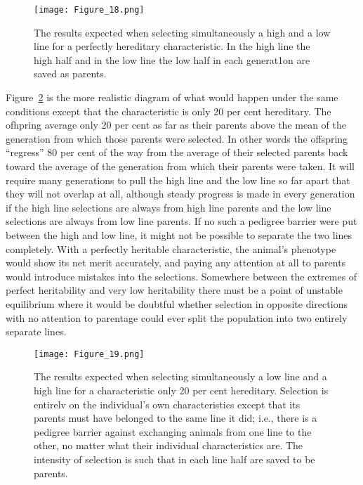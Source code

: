 \begin{figure}
	\centering
    \texttt{[image: Figure\_18.png]}
    \caption{The results expected when selecting simultaneously a high and a low
			 line for a perfectly hereditary characteristic. In the high line the high half and in
			 the low line the low half in each generat1on are saved as parents.}
    \label{fig:Lush_Figure_18}
\end{figure}

Figure~\ref{fig:Lush_Figure_19} is the more realistic diagram of what would happen under
the same conditions except that the characteristic is only 20 per cent
hereditary. The ofhpring average only 20 per cent as far as their parents
above the mean of the generation from which those parents were
selected. In other words the offspring ``regress'' 80 per cent of the way
from the average of their selected parents back toward the average of
the generation from which their parents were taken. It will require
many generations to pull the high line and the low line so far apart that
they will not overlap at all, although steady progress is made in every
generation if the high line selections are always from high line parents
and the low line selections are always from low line parents. If no such
a pedigree barrier were put between the high and low line, it might not
be possible to separate the two lines completely. With a perfectly heritable
characteristic, the animal's phenotype would show its net merit
accurately, and paying any attention at all to parents would introduce
mistakes into the selections. Somewhere between the extremes of perfect
heritability and very low heritability there must be a point of
unstable equilibrium where it would be doubtful whether selection in
opposite directions with no attention to parentage could ever split the
population into two entirely separate lines.

\begin{figure}
	\centering
    \texttt{[image: Figure\_19.png]}
    \caption{The results expected when selecting simultaneously a low line and a
			 high line for a characteristic only 20 per cent hereditary. Selection is entirelv on the
			 individual's own characteristics except that its parents must have belonged to the
			 same line it did; i.e., there is a pedigree barrier against exchanging animals from one
			 line to the other, no matter what their individual characteristics are. The intensity of
			 selection is such that in each line half are saved to be parents.}
    \label{fig:Lush_Figure_19}
\end{figure}

